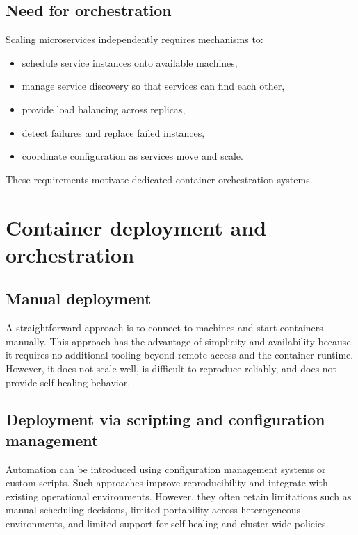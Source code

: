 \documentclass[11pt,a4paper,openany]{report}
\begin{document}
\subsection{Need for orchestration}

Scaling microservices independently requires mechanisms to:

\begin{itemize}
\item schedule service instances onto available machines,
\item manage service discovery so that services can find each other,
\item provide load balancing across replicas,
\item detect failures and replace failed instances,
\item coordinate configuration as services move and scale.
\end{itemize}

These requirements motivate dedicated container orchestration systems.

\section{Container deployment and orchestration}

\subsection{Manual deployment}

A straightforward approach is to connect to machines and start containers manually. This approach has the advantage of simplicity and availability because it requires no additional tooling beyond remote access and the container runtime. However, it does not scale well, is difficult to reproduce reliably, and does not provide self-healing behavior.

\subsection{Deployment via scripting and configuration management}

Automation can be introduced using configuration management systems or custom scripts. Such approaches improve reproducibility and integrate with existing operational environments. However, they often retain limitations such as manual scheduling decisions, limited portability across heterogeneous environments, and limited support for self-healing and cluster-wide policies.
\end{document}
